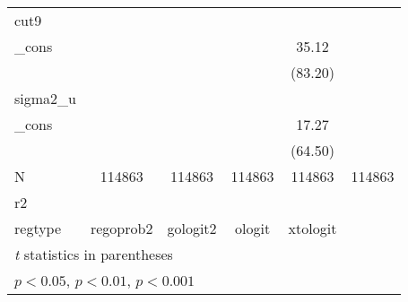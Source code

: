 {\begin{tabular}{l*{5}{c}}
\hline
cut9        &                     &                     &                     &                     &                     \\
\_cons      &                     &                     &                     &       35.12\sym{***}&                     \\
            &                     &                     &                     &     (83.20)         &                     \\
\hline
sigma2\_u    &                     &                     &                     &                     &                     \\
\_cons      &                     &                     &                     &       17.27\sym{***}&                     \\
            &                     &                     &                     &     (64.50)         &                     \\
\hline
N           &      114863         &      114863         &      114863         &      114863         &      114863         \\
r2          &                     &                     &                     &                     &                     \\
regtype     &   regoprob2         &    gologit2         &      ologit         &    xtologit         &                     \\
\hline\hline
\multicolumn{6}{l}{\footnotesize \textit{t} statistics in parentheses}\\
\multicolumn{6}{l}{\footnotesize \sym{*} \(p<0.05\), \sym{**} \(p<0.01\), \sym{***} \(p<0.001\)}\\
\end{tabular}
}
